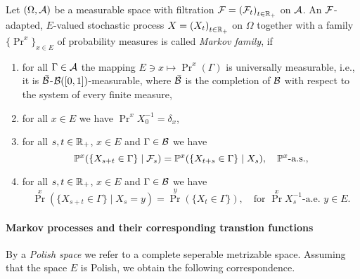 \documentclass[../Master.tex]{subfiles}
\begin{document}
\begin{definition}\label{def:Markov_family}
  Let \((\Omega, \mathcal{A})\) be a measurable space with filtration \(\mathcal{F} = {(\mathcal{F}_t)}_{t \in \mathbb{R}_+}\) on \(\mathcal{A} \).
  An \(\mathcal{F}\)-adapted, \(E\)-valued stochastic process \(X = {(X_t)}_{t \in \mathbb{R}_+}\) on \(\Omega \) together with a family \({\{\Pr^x\}}_{x \in E} \) of probability measures is called \textit{Markov family}, if
  \begin{enumerate}[label = (\roman*)]
    \item for all \(\Gamma \in \mathcal{A}\) the mapping \(E \ni x \mapsto \Pr^x (\Gamma)\) is universally measurable, i.e., it is \(\bar{\mathcal{B}}\)-\(\mathcal{B}([0,1])\)-measurable, where \(\bar{\mathcal{B}}\) is the completion of \(\mathcal{B}\) with respect to the system of every finite measure,
    \item for all \(x \in E\) we have \(\Pr^x X_0^{-1} = \delta_x\),
    \item for all \(s,t \in \mathbb{R}_+ \), \(x \in E \) and \(\Gamma \in \mathcal{B} \) we have 
    \begin{equation}\label{Markov_family_condition}
      \mathbb{P}^x(\{X_{s + t} \in \Gamma \} \mid \mathcal{F}_s) = \mathbb{P}^x(\{X_{t + s} \in \Gamma\} \mid X_s) , \quad \mathbb{P}^x \text{-a.s.},
    \end{equation}
    \item\label{item:Markov_restart} for all \(s,t \in \mathbb{R}_+ \), \(x \in E \) and \(\Gamma \in \mathcal{B} \) we have 
    \begin{equation}\label{Markov_family_condition}
      \Pr^x(\{X_{s + t} \in \Gamma \} \mid X_s = y) = \Pr^y(\{X_t \in \Gamma\}) , \quad  \text{for } \Pr^x X_s^{-1} \text{-a.e. } y \in E.
    \end{equation}
  \end{enumerate}
\end{definition}


\paragraph{Markov processes and their corresponding transtion functions}

By a \emph{Polish space} we refer to a complete seperable metrizable space. Assuming that the space \(E\) is Polish, we obtain the following correspondence.
\end{document}
